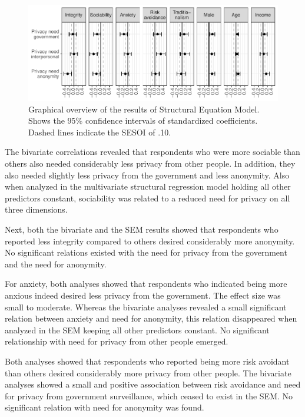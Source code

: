 \documentclass[man,floatsintext]{apa6}
\begin{document}
\begin{figure}
\centering
\includegraphics{manuscript_files/figure-latex/sem-fig-1.pdf}
\caption{\label{fig:sem-fig}Graphical overview of the results of Structural Equation Model. Shows the 95\% confidence intervals of standardized coefficients. Dashed lines indicate the SESOI of \textbar{}.10\textbar{}.}
\end{figure}

The bivariate correlations revealed that respondents who were more sociable than others also needed considerably less privacy from other people. In addition, they also needed slightly less privacy from the government and less anonymity. Also when analyzed in the multivariate structural regression model holding all other predictors constant, sociability was related to a reduced need for privacy on all three dimensions.

Next, both the bivariate and the SEM results showed that respondents who reported less integrity compared to others desired considerably more anonymity. No significant relations existed with the need for privacy from the government and the need for anonymity.

For anxiety, both analyses showed that respondents who indicated being more anxious indeed desired less privacy from the government. The effect size was small to moderate. Whereas the bivariate analyses revealed a small significant relation between anxiety and need for anonymity, this relation disappeared when analyzed in the SEM keeping all other predictors constant. No significant relationship with need for privacy from other people emerged.

Both analyses showed that respondents who reported being more risk avoidant than others desired considerably more privacy from other people. The bivariate analyses showed a small and positive association between risk avoidance and need for privacy from government surveillance, which ceased to exist in the SEM. No significant relation with need for anonymity was found.
\end{document}

